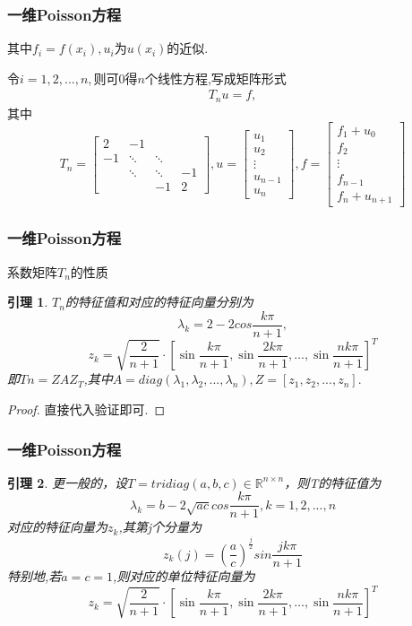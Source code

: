 \documentclass[notheorems,serif]{beamer}
\renewcommand{\normalsize}{\wuhao}
\newcommand{\wuhao}{\fontsize{10.5pt}{\baselineskip}\selectfont}
\newcommand{\hei}[1]{{\HEI#1}}
\newtheorem{lemma}{\hei{引理}}
\begin{document}
\begin{frame}\frametitle{一维Poisson方程}
其中$f_i=f(x_i),u_i$为$u(x_i)$的近似.

令$i= 1,2,...,n,$则可0得$n$个线性方程,写成矩阵形式
\begin{align}
{T_nu=f,}
\tag{6.2}
\end{align}
其中
\begin{equation}
T_{n}=\left[\begin{array}{cccc}{2} & {-1} & {} & {} \\ {-1} & {\ddots} & {\ddots} & {} \\ {} & {\ddots} & {\ddots} & {-1} \\ {} & {} & {-1} & {2}\end{array}\right], u=\left[\begin{array}{c}{u_{1}} \\ {u_{2}} \\ {\vdots} \\ {u_{n-1}} \\ {u_{n}}\end{array}\right], f=\left[\begin{array}{c}{f_{1}+u_{0}} \\ {f_{2}} \\ {\vdots} \\ {f_{n-1}} \\ {f_{n}+u_{n+1}}\end{array}\right]
\tag{6.3}
\end{equation}
\end{frame}

\begin{frame}\frametitle{一维Poisson方程}
{\color{blue}\Large 系数矩阵$T_n$的性质}

\quad

\normalsize
\begin{lemma}
$T_n$的特征值和对应的特征向量分别为
$$
\lambda_k=2-2cos\frac{k\pi}{n+1},
$$
$$
z_{k}=\sqrt{\frac{2}{n+1}} \cdot\left[\sin \frac{k \pi}{n+1}, \sin \frac{2 k \pi}{n+1}, \ldots, \sin \frac{n k \pi}{n+1}\right]^{T}
$$
即$Tn=ZAZ_T$,其中$A=diag(\lambda_1,\lambda_2,...,\lambda_n),Z= [z_1,z_2,...,z_n].$
\end{lemma}

\begin{proof}
直接代入验证即可.
\end{proof}
\end{frame}

\begin{frame}\frametitle{一维Poisson方程}
\begin{lemma}

更一般的，设$T=tridiag(a,b,c)\in \mathbb{R}^{n\times n}$，则T的特征值为
$$
\lambda_k=b-2\sqrt{ac}cos\frac{k\pi}{n+1},k=1,2,...,n
$$
对应的特征向量为$z_k$,其第j个分量为
$$
z_k(j)=(\frac{a}{c})^{\frac{j}{2}}sin\frac{jk\pi}{n+1}
$$
特别地,若$a=c=1$,则对应的单位特征向量为
$$
z_{k}=\sqrt{\frac{2}{n+1}} \cdot\left[\sin \frac{k \pi}{n+1}, \sin \frac{2 k \pi}{n+1}, \ldots, \sin \frac{n k \pi}{n+1}\right]^{T}
$$

\end{lemma}
\end{frame}
\end{document}

